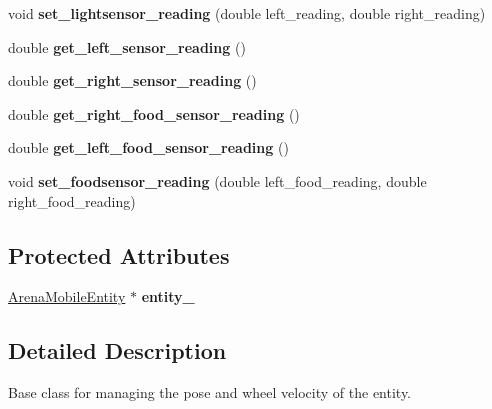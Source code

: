 \begin{DoxyCompactItemize}
\item 
void {\bfseries set\+\_\+lightsensor\+\_\+reading} (double left\+\_\+reading, double right\+\_\+reading)\hypertarget{class_motion_handler_a96451327dddb6a7d7eef689498abbde2}{}\label{class_motion_handler_a96451327dddb6a7d7eef689498abbde2}

\item 
double {\bfseries get\+\_\+left\+\_\+sensor\+\_\+reading} ()\hypertarget{class_motion_handler_ab7959aa3946b9a91570a990e0350f538}{}\label{class_motion_handler_ab7959aa3946b9a91570a990e0350f538}

\item 
double {\bfseries get\+\_\+right\+\_\+sensor\+\_\+reading} ()\hypertarget{class_motion_handler_ac97d180150dade9601bbed25a248f150}{}\label{class_motion_handler_ac97d180150dade9601bbed25a248f150}

\item 
double {\bfseries get\+\_\+right\+\_\+food\+\_\+sensor\+\_\+reading} ()\hypertarget{class_motion_handler_a2fadcc5b46f73af637732ffc35e0a9a9}{}\label{class_motion_handler_a2fadcc5b46f73af637732ffc35e0a9a9}

\item 
double {\bfseries get\+\_\+left\+\_\+food\+\_\+sensor\+\_\+reading} ()\hypertarget{class_motion_handler_a23c4bc0d6ce0657c7007c59380bf2d48}{}\label{class_motion_handler_a23c4bc0d6ce0657c7007c59380bf2d48}

\item 
void {\bfseries set\+\_\+foodsensor\+\_\+reading} (double left\+\_\+food\+\_\+reading, double right\+\_\+food\+\_\+reading)\hypertarget{class_motion_handler_ad3d6d67491b4b06fc85902a12cc21699}{}\label{class_motion_handler_ad3d6d67491b4b06fc85902a12cc21699}

\end{DoxyCompactItemize}
\subsection*{Protected Attributes}
\begin{DoxyCompactItemize}
\item 
\hyperlink{class_arena_mobile_entity}{Arena\+Mobile\+Entity} $\ast$ {\bfseries entity\+\_\+}\hypertarget{class_motion_handler_a659fd1ec8878260a63779bf45681f5a4}{}\label{class_motion_handler_a659fd1ec8878260a63779bf45681f5a4}

\end{DoxyCompactItemize}


\subsection{Detailed Description}
Base class for managing the pose and wheel velocity of the entity. 

